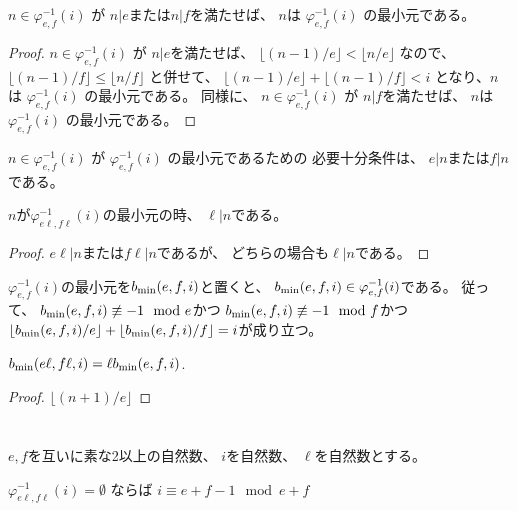 \begin{lemma}
$n \in \varphi_{e,f}^{-1}(i)$
が
$n | e$または$n | f$を満たせば、
$n$は
$\varphi_{e,f}^{-1}(i)$
の最小元である。
\end{lemma}

\begin{proof}
$n \in \varphi_{e,f}^{-1}(i)$
が
$n | e$を満たせば、
$
\lfloor (n-1) / e \rfloor < \lfloor n / e \rfloor
$
なので、
$
\lfloor (n-1) / f \rfloor \le \lfloor n / f \rfloor
$
と併せて、
$\lfloor (n-1) / e \rfloor + \lfloor (n-1) / f \rfloor < i$
となり、$n$は
$\varphi_{e,f}^{-1}(i)$
の最小元である。
同様に、
$n \in \varphi_{e,f}^{-1}(i)$
が
$n | f$を満たせば、
$n$は
$\varphi_{e,f}^{-1}(i)$
の最小元である。
\end{proof}

\begin{lemma}
$n \in \varphi_{e,f}^{-1}(i)$
が
$\varphi_{e,f}^{-1}(i)$
の最小元であるための
必要十分条件は、
$e | n$または$f | n$である。
\end{lemma}

\begin{lemma}
$n$が$\varphi_{e \ell, f \ell}^{-1}(i)$の最小元の時、
$\ell | n$である。
\end{lemma}

\begin{proof}
$e \ell| n$または$f \ell| n$であるが、
どちらの場合も$\ell | n$である。
\end{proof}

$\varphi_{e,f}^{-1}(i)$の最小元を$b_{\mathrm{min}}(e,f,i)$と置くと、
$b_{\mathrm{min}}(e,f,i) \in \varphi_{e,f}^{-1}(i)$である。
従って、
$b_{\mathrm{min}}(e,f,i) \not \equiv -1 \mod e$かつ
$b_{\mathrm{min}}(e,f,i) \not \equiv -1 \mod f$かつ
$\lfloor b_{\mathrm{min}}(e,f,i) / e \rfloor + \lfloor b_{\mathrm{min}}(e,f,i) / f \rfloor = i$が成り立つ。

\begin{lemma}
\label{lm:b_min_mul_l}
$b_{\mathrm{min}}(e \ell, f \ell, i) = \ell b_{\mathrm{min}}(e,f,i)$.
\end{lemma}

\begin{proof}
$\lfloor (n+1) / e \rfloor$
\end{proof}

\section{}

$e, f$を互いに素な2以上の自然数、
$i$を自然数、
$\ell$を自然数とする。

\begin{lemma}
$
\varphi_{e \ell, f \ell}^{-1}(i) = \emptyset
$
ならば
$
i \equiv e + f - 1 \mod e + f
$
\end{lemma}

